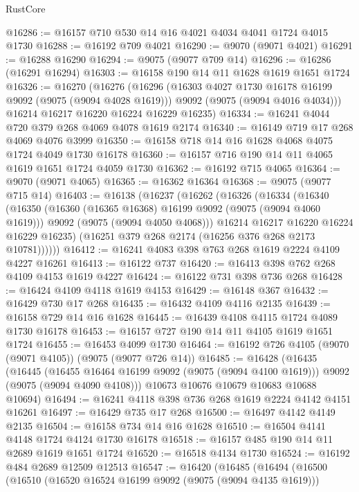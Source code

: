 \begin{lexlean}{RustCore}
\begin{coremodule}
@16286 := @16157 @710 @530 @14 @16 @4021 @4034 @4041 @1724 @4015 @1730
@16288 := @16192 @709 @4021
@16290 := @9070 (@9071 @4021)
@16291 := @16288 @16290
@16294 := @9075 (@9077 @709 @14)
@16296 := @16286 (@16291 @16294)
@16303 := @16158 @190 @14 @11 @1628 @1619 @1651 @1724
@16326 := @16270
    (@16276
      (@16296
        (@16303 @4027 @1730 @16178 @16199 @9092 (@9075 (@9094 @4028 @1619)))
        @9092
        (@9075 (@9094 @4016 @4034)))
      @16214
      @16217
      @16220
      @16224
      @16229
      @16235)
@16334 := @16241 @4044 @720 @379 @268 @4069 @4078 @1619 @2174
@16340 := @16149 @719 @17 @268 @4069 @4076 @3999
@16350 := @16158 @718 @14 @16 @1628 @4068 @4075 @1724 @4049 @1730 @16178
@16360 := @16157 @716 @190 @14 @11 @4065 @1619 @1651 @1724 @4059 @1730
@16362 := @16192 @715 @4065
@16364 := @9070 (@9071 @4065)
@16365 := @16362 @16364
@16368 := @9075 (@9077 @715 @14)
@16403 := @16138
    (@16237
      (@16262
        (@16326
          (@16334
            (@16340
              (@16350
                (@16360 (@16365 @16368) @16199 @9092 (@9075 (@9094 @4060 @1619)))
                @9092
                (@9075 (@9094 @4050 @4068)))
              @16214
              @16217
              @16220
              @16224
              @16229
              @16235)
            (@16251 @379 @268 @2174 (@16256 @376 @268 @2173 @10781))))))
@16412 := @16241 @4083 @398 @763 @268 @1619 @2224 @4109 @4227 @16261
@16413 := @16122 @737
@16420 := @16413 @398 @762 @268 @4109 @4153 @1619 @4227
@16424 := @16122 @731 @398 @736 @268
@16428 := @16424 @4109 @4118 @1619 @4153
@16429 := @16148 @367
@16432 := @16429 @730 @17 @268
@16435 := @16432 @4109 @4116 @2135
@16439 := @16158 @729 @14 @16 @1628
@16445 := @16439 @4108 @4115 @1724 @4089 @1730 @16178
@16453 := @16157 @727 @190 @14 @11 @4105 @1619 @1651 @1724
@16455 := @16453 @4099 @1730
@16464 := @16192 @726 @4105 (@9070 (@9071 @4105)) (@9075 (@9077 @726 @14))
@16485 := @16428
    (@16435
      (@16445
        (@16455 @16464 @16199 @9092 (@9075 (@9094 @4100 @1619)))
        @9092
        (@9075 (@9094 @4090 @4108)))
      @10673
      @10676
      @10679
      @10683
      @10688
      @10694)
@16494 := @16241 @4118 @398 @736 @268 @1619 @2224 @4142 @4151 @16261
@16497 := @16429 @735 @17 @268
@16500 := @16497 @4142 @4149 @2135
@16504 := @16158 @734 @14 @16 @1628
@16510 := @16504 @4141 @4148 @1724 @4124 @1730 @16178
@16518 := @16157 @485 @190 @14 @11 @2689 @1619 @1651 @1724
@16520 := @16518 @4134 @1730
@16524 := @16192 @484 @2689 @12509 @12513
@16547 := @16420
    (@16485
      (@16494
        (@16500
          (@16510
            (@16520 @16524 @16199 @9092 (@9075 (@9094 @4135 @1619)))

\end{coremodule}
\end{lexlean}
